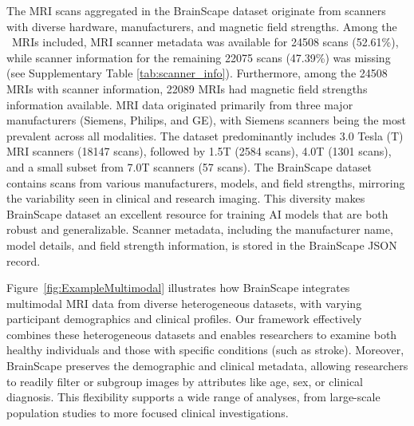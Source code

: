 The MRI scans aggregated in the BrainScape dataset originate from scanners with diverse hardware, manufacturers, and magnetic field strengths.
Among the \TotalNumMRIs\ MRIs included, MRI scanner metadata was available for 24508 scans (52.61\%), 
while scanner information for the remaining 22075 scans (47.39\%) was missing (see Supplementary Table \ref{tab:scanner_info}). 
Furthermore, among the 24508 MRIs with scanner information, 22089 MRIs had magnetic field strengths information available.
MRI data originated primarily from three major manufacturers (Siemens, Philips, and GE), 
with Siemens scanners being the most prevalent across all modalities. 
The dataset predominantly includes 3.0 Tesla (T) MRI scanners (18147 scans), followed by 1.5T (2584 scans), 
4.0T (1301 scans), and a small subset from 7.0T scanners (57 scans). 
The BrainScape dataset contains scans from various manufacturers, models, and field strengths, 
mirroring the variability seen in clinical and research imaging. 
This diversity makes BrainScape dataset an excellent resource for training AI models that are both robust and generalizable.
Scanner metadata, including the manufacturer name, model details, and field strength information, is stored in the BrainScape JSON record.

Figure~\ref{fig:ExampleMultimodal} illustrates how BrainScape integrates multimodal MRI data 
from diverse heterogeneous datasets, with varying participant demographics and clinical profiles. 
Our framework effectively combines these heterogeneous datasets and enables researchers 
to examine both healthy individuals and those with specific conditions (such as stroke). 
Moreover, BrainScape preserves the demographic and clinical metadata, allowing researchers 
to readily filter or subgroup images by attributes like age, sex, or clinical diagnosis. 
This flexibility supports a wide range of analyses, from large-scale population studies 
to more focused clinical investigations.

